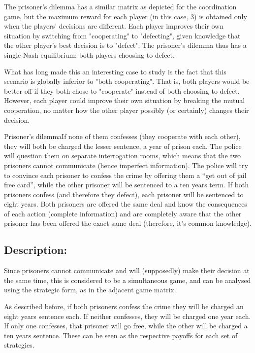 \documentclass[]{report}
\begin{document}
The prisoner's dilemma has a similar matrix as depicted for the coordination game, but the maximum reward for each player (in this case, 3) is obtained only when the players' decisions are different. Each player improves their own situation by switching from "cooperating" to "defecting", given knowledge that the other player's best decision is to "defect". The prisoner's dilemma thus has a single Nash equilibrium: both players choosing to defect.

What has long made this an interesting case to study is the fact that this scenario is globally inferior to "both cooperating". That is, both players would be better off if they both chose to "cooperate" instead of both choosing to defect. However, each player could improve their own situation by breaking the mutual cooperation, no matter how the other player possibly (or certainly) changes their decision.




Prisoner's dilemmaIf none of them confesses (they cooperate with each other), they will both be charged the lesser sentence, a year of prison each. The police will question them on separate interrogation rooms, which means that the two prisoners cannot communicate (hence imperfect information). The police will try to convince each prisoner to confess the crime by offering them a “get out of jail free card”, while the other prisoner will be sentenced to a ten years term. If both prisoners confess (and therefore they defect), each prisoner will be sentenced to eight years. Both prisoners are offered the same deal and know the consequences of each action (complete information) and are completely aware that the other prisoner has been offered the exact same deal (therefore, it’s common knowledge).



\subsection{Description:}

Since prisoners cannot communicate and will (supposedly) make their decision at the same time, this is considered to be a simultaneous game, and can be analysed using the strategic form, as in the adjacent game matrix. 

As described before, if both prisoners confess the crime they will be charged an eight years sentence each. If neither confesses, they will be charged one year each. If only one confesses, that prisoner will go free, while the other will be charged a ten years sentence. These can be seen as the respective payoffs for each set of strategies.
\end{document}
